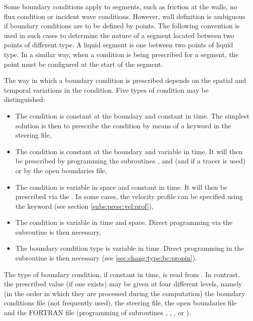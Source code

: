 Some boundary conditions apply to segments, such as friction at the walls,
no flux condition or incident wave conditions.
However, wall definition is ambiguous if boundary conditions are to be defined
by points.
The following convention is used in such cases to determine the nature of a
segment located between two points of different type.
A liquid segment is one between two points of liquid type.
In a similar way, when a condition is being prescribed for a segment,
the point must be configured at the start of the segment.

The way in which a boundary condition is prescribed depends on the spatial
and temporal variations in the condition.
Five types of condition may be distinguished:

\begin{itemize}
\item The condition is constant at the boundary and constant in time.
The simplest solution is then to prescribe the condition by means of a keyword
in the steering file,

\item The condition is constant at the boundary and variable in time.
It will then be prescribed by programming the subroutines ,
 and  (and 
if a tracer is used) or by the open boundaries file,

\item The condition is variable in space and constant in time.
It will then be prescribed via the .
In some cases, the velocity profile can be specified using the keyword
 (see section \ref{subs:presc:vel:prof}),

\item The condition is variable in time and space.
Direct programming via the  subroutine is then necessary,

\item The boundary condition type is variable in time.
Direct programming in the  subroutine is then
necessary (see \ref{sec:chang:type:bc:propin}).
\end{itemize}

The type of boundary condition, if constant in time, is read from
.
In contrast, the prescribed value (if one exists) may be given at four different
levels, namely (in the order in which they are processed during the computation)
the boundary conditions file (not frequently used), the steering file,
the open boundaries file and the FORTRAN file (programming of subroutines
, , , 
or ).


